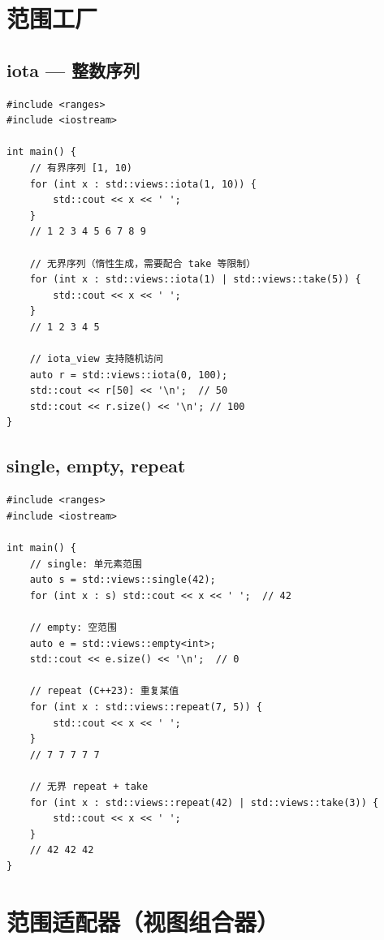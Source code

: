 \documentclass[12pt,a4paper,fontset=fandol]{ctexbook}
\begin{document}
\chapter{范围工厂}

\section{iota --- 整数序列}

\begin{lstlisting}
#include <ranges>
#include <iostream>

int main() {
    // 有界序列 [1, 10)
    for (int x : std::views::iota(1, 10)) {
        std::cout << x << ' ';
    }
    // 1 2 3 4 5 6 7 8 9

    // 无界序列（惰性生成，需要配合 take 等限制）
    for (int x : std::views::iota(1) | std::views::take(5)) {
        std::cout << x << ' ';
    }
    // 1 2 3 4 5

    // iota_view 支持随机访问
    auto r = std::views::iota(0, 100);
    std::cout << r[50] << '\n';  // 50
    std::cout << r.size() << '\n'; // 100
}
\end{lstlisting}

\section{single, empty, repeat}

\begin{lstlisting}
#include <ranges>
#include <iostream>

int main() {
    // single: 单元素范围
    auto s = std::views::single(42);
    for (int x : s) std::cout << x << ' ';  // 42

    // empty: 空范围
    auto e = std::views::empty<int>;
    std::cout << e.size() << '\n';  // 0

    // repeat (C++23): 重复某值
    for (int x : std::views::repeat(7, 5)) {
        std::cout << x << ' ';
    }
    // 7 7 7 7 7

    // 无界 repeat + take
    for (int x : std::views::repeat(42) | std::views::take(3)) {
        std::cout << x << ' ';
    }
    // 42 42 42
}
\end{lstlisting}

\chapter{范围适配器（视图组合器）}
\end{document}
